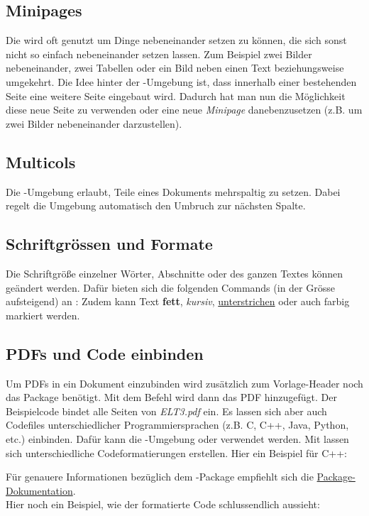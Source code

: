 \subsection{Minipages}
Die  wird oft genutzt um Dinge nebeneinander setzen zu können, die sich sonst nicht so einfach nebeneinander setzen lassen. Zum Beispiel zwei Bilder nebeneinander, zwei Tabellen oder ein Bild neben einen Text beziehungsweise umgekehrt. Die Idee hinter der -Umgebung ist, dass innerhalb einer bestehenden Seite eine weitere Seite eingebaut wird. Dadurch hat man nun die Möglichkeit diese neue Seite zu verwenden oder eine neue \textit{Minipage} danebenzusetzen (z.B. um zwei Bilder nebeneinander darzustellen).
$ $

\subsection{Multicols}
Die -Umgebung erlaubt, Teile eines Dokuments mehrspaltig zu setzen. Dabei regelt die Umgebung automatisch den Umbruch zur nächsten Spalte.
\subsection{Schriftgrössen und Formate}
Die Schriftgröße einzelner Wörter, Abschnitte oder des ganzen Textes können geändert werden. Dafür bieten sich die folgenden Commands (in der Grösse aufsteigend) an :
Zudem kann Text \textbf{fett}, \textit{kursiv}, \underline{unterstrichen} oder auch {\color{red}farbig markiert} werden.

\subsection{PDFs und Code einbinden}
Um PDFs in ein Dokument einzubinden wird zusätzlich zum Vorlage-Header noch das Package  benötigt. Mit dem Befehl  wird dann das PDF hinzugefügt. Der Beispielcode bindet alle Seiten von \textit{\glqq ELT3.pdf \grqq} ein.
Es lassen sich aber auch Codefiles unterschiedlicher Programmiersprachen (z.B. C, C++, Java, Python, etc.) einbinden. Dafür kann die -Umgebung oder  verwendet werden. Mit  lassen sich unterschiedliche Codeformatierungen erstellen. Hier ein Beispiel für C++:  

Für genauere Informationen bezüglich dem -Package empfiehlt sich die  {\color{blue}\href{http://users.ecs.soton.ac.uk/srg/softwaretools/document/start/listings.pdf}{Package-Dokumentation}}. \vspace{6pt}\\
Hier noch ein Beispiel, wie der formatierte Code schlussendlich aussieht:
\clearpage

